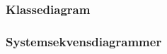 \subsubsection{Klassediagram}%
\label{ssub:klassediagram}


\subsubsection{Systemsekvensdiagrammer}%
\label{ssub:systemsekvensdiagrammer}

